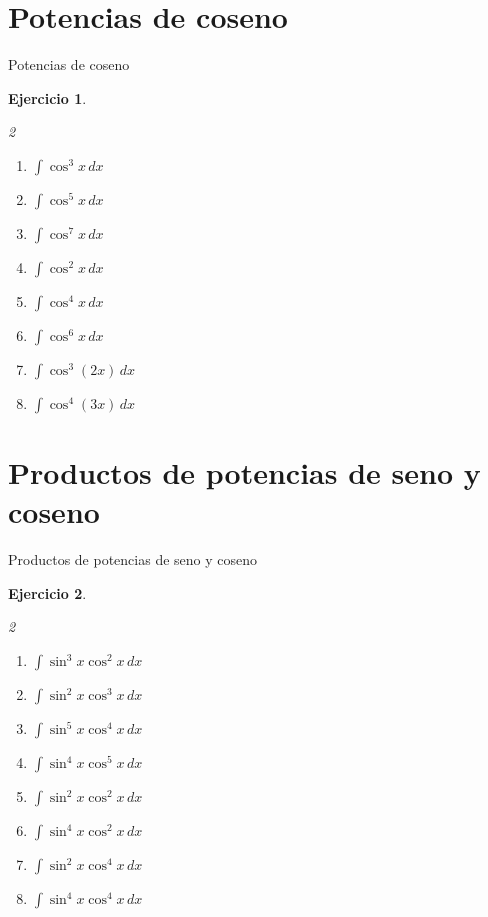 \documentclass[10pt,aspectratio=169]{beamer}
\newtheorem{Ejer}{Ejercicio}
\begin{document}
\section{Potencias de coseno}
\begin{frame}{Potencias de coseno}
\begin{Ejer}
\begin{multicols}{2}
\begin{enumerate}
\item $\displaystyle \int \cos^3 x\,dx$
\item $\displaystyle \int \cos^5 x\,dx$
\item $\displaystyle \int \cos^7 x\,dx$
\item $\displaystyle \int \cos^2 x\,dx$
\item $\displaystyle \int \cos^4 x\,dx$
\item $\displaystyle \int \cos^6 x\,dx$
\item $\displaystyle \int \cos^3(2x)\,dx$
\item $\displaystyle \int \cos^4(3x)\,dx$
\end{enumerate}
\end{multicols}
\end{Ejer}
\end{frame}

\section{Productos de potencias de seno y coseno}
\begin{frame}{Productos de potencias de seno y coseno}
\begin{Ejer}
\begin{multicols}{2}
\begin{enumerate}
\item $\displaystyle \int \sin^3 x\cos^2 x\,dx$
\item $\displaystyle \int \sin^2 x\cos^3 x\,dx$
\item $\displaystyle \int \sin^5 x\cos^4 x\,dx$
\item $\displaystyle \int \sin^4 x\cos^5 x\,dx$
\item $\displaystyle \int \sin^2 x\cos^2 x\,dx$
\item $\displaystyle \int \sin^4 x\cos^2 x\,dx$
\item $\displaystyle \int \sin^2 x\cos^4 x\,dx$
\item $\displaystyle \int \sin^4 x\cos^4 x\,dx$
\end{enumerate}
\end{multicols}
\end{Ejer}
\end{frame}
\end{document}
